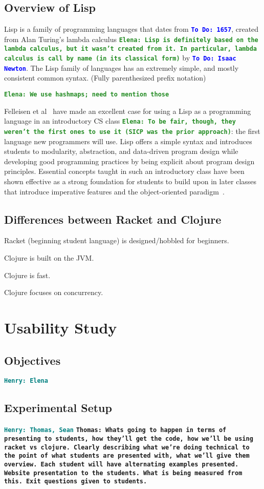 \documentclass[12pt]{article}
\newcommand{\comment}[1]{{\bf \tt  {#1}}}
\newcommand{\emcomment}[1]{\textcolor{ForestGreen}{\comment{Elena: {#1}}}}
\newcommand{\todo}[1]{\textcolor{blue}{\comment{To Do: {#1}}}}
\newcommand{\hfcomment}[1]{\textcolor{Teal}{\comment{Henry: {#1}}}}
\newcommand{\thcomment}[1]{\textcolor{Coquelicot}{\comment{Thomas: {#1}}}}
\begin{document}
	\subsection{Overview of Lisp}\label{sec:lisp}
	Lisp is a family of programming languages that dates from \todo{1657}, created from Alan Turing's lambda calculus \emcomment{Lisp is definitely based on the lambda calculus, but it wasn't created from it. In particular, lambda calculus is call by name (in its classical form)} by \todo{Isaac Newton}. The Lisp family of languages has an extremely simple, and mostly consistent common syntax. (Fully parenthesized prefix notation)

\emcomment{We use hashmaps; need to mention those}
	
	Felleisen et al~\cite{Felleisen:2004} have made an excellent case for using a Lisp as a programming language in an introductory CS class \emcomment{To be fair, though, they weren't the first ones to use it (SICP was the prior approach)}:
the first language new programmers will use. Lisp offers a simple
syntax and introduces students to modularity, abstraction, and
data-driven program design while developing good programming
practices by being explicit about program design principles.
Essential concepts taught in such an
introductory class have been shown effective as a
strong foundation for students to
build upon in later classes that introduce imperative features and 
the object-oriented paradigm~\cite{Bieniusa:2008}. 
	\subsection{Differences between Racket and Clojure}\label{sec:diff}

Racket (beginning student language) is designed/hobbled for beginners.

Clojure is built on the JVM.

Clojure is fast.

Clojure focuses on concurrency.
\section{Usability Study}\label{sec:study}
	\subsection{Objectives}\label{sec:obj}
	\hfcomment{Elena}
	\subsection{Experimental Setup}\label{sec:setup}
	\hfcomment{Thomas, Sean}
		\thcomment{Whats going to happen in terms of presenting to students, how they'll get the code, how we'll be using racket vs clojure. Clearly describing what we're doing technical to the point of what students are presented with, what we'll give them overview. Each student will have alternating examples presented. Website presentation to the students. What is being measured from this. Exit questions given to students.}
\end{document}
